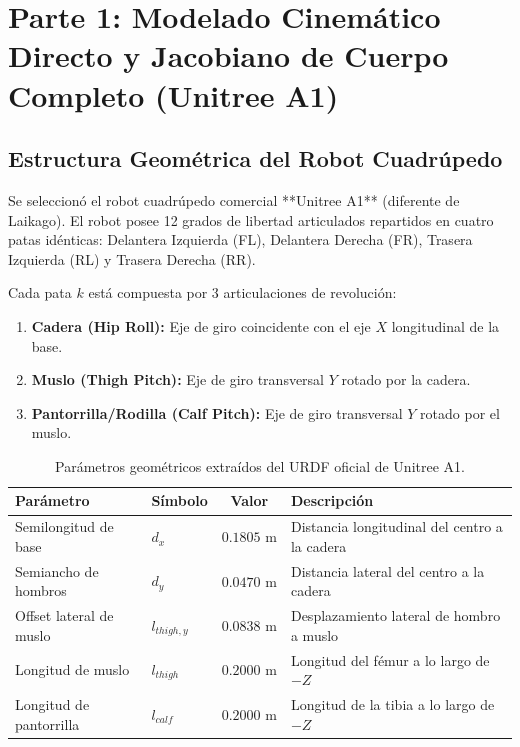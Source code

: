 \documentclass[11pt,a4paper]{article}
\begin{document}
\section{Parte 1: Modelado Cinemático Directo y Jacobiano de Cuerpo Completo (Unitree A1)}

\subsection{Estructura Geométrica del Robot Cuadrúpedo}
Se seleccionó el robot cuadrúpedo comercial **Unitree A1** (diferente de Laikago). El robot posee 12 grados de libertad articulados repartidos en cuatro patas idénticas: Delantera Izquierda (FL), Delantera Derecha (FR), Trasera Izquierda (RL) y Trasera Derecha (RR).

Cada pata $k$ está compuesta por 3 articulaciones de revolución:
\begin{enumerate}
    \item \textbf{Cadera (Hip Roll):} Eje de giro coincidente con el eje $X$ longitudinal de la base.
    \item \textbf{Muslo (Thigh Pitch):} Eje de giro transversal $Y$ rotado por la cadera.
    \item \textbf{Pantorrilla/Rodilla (Calf Pitch):} Eje de giro transversal $Y$ rotado por el muslo.
\end{enumerate}

\begin{table}[H]
\centering
\caption{Parámetros geométricos extraídos del URDF oficial de Unitree A1.}
\begin{tabular}{@{}llcl@{}}
\toprule
\textbf{Parámetro} & \textbf{Símbolo} & \textbf{Valor} & \textbf{Descripción} \\ \midrule
Semilongitud de base & $d_x$ & $0.1805\text{ m}$ & Distancia longitudinal del centro a la cadera \\
Semiancho de hombros & $d_y$ & $0.0470\text{ m}$ & Distancia lateral del centro a la cadera \\
Offset lateral de muslo & $l_{thigh,y}$ & $0.0838\text{ m}$ & Desplazamiento lateral de hombro a muslo \\
Longitud de muslo & $l_{thigh}$ & $0.2000\text{ m}$ & Longitud del fémur a lo largo de $-Z$ \\
Longitud de pantorrilla & $l_{calf}$ & $0.2000\text{ m}$ & Longitud de la tibia a lo largo de $-Z$ \\ \bottomrule
\end{tabular}
\end{table}
\end{document}
